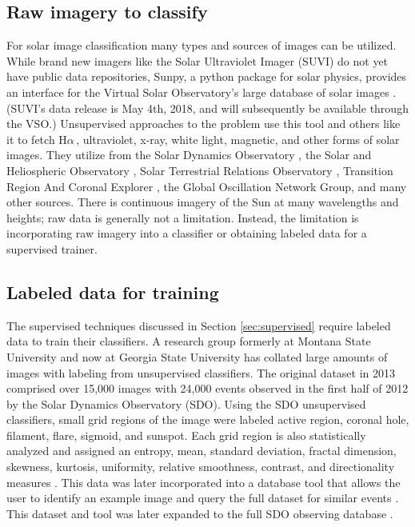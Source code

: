 \documentclass[twoside]{report}
\newcommand{\halpha}{H$\alpha$\,}
\begin{document}
\subsection{Raw imagery to classify} 
For solar image classification many types and sources of images can be utilized. While brand new imagers like the Solar Ultraviolet Imager (SUVI) do not yet have public data repositories, Sunpy, a python package for solar physics, provides an interface for the Virtual Solar Observatory's large database of solar images \cite{sunpy}. (SUVI's data release is May 4th, 2018, and will subsequently be available through the VSO.) Unsupervised approaches to the problem use this tool and others like it to fetch \halpha, ultraviolet, x-ray, white light, magnetic, and other forms of solar images. They utilize from the Solar Dynamics Observatory \cite{sdoinstrument, lemen:2012}, the Solar and Heliospheric Observatory \cite{sohoinstrument, eit}, Solar Terrestrial Relations Observatory \cite{stereoinstrument, secchipaper}, Transition Region And Coronal Explorer \cite{traceinstrument}, the Global Oscillation Network Group\cite{gong1, gong2}, and many other sources. There is continuous imagery of the Sun at many wavelengths and heights; raw data is generally not a limitation. Instead, the limitation is incorporating raw imagery into a classifier or obtaining labeled data for a supervised trainer. 

\subsection{Labeled data for training} 
The supervised techniques discussed in Section \ref{sec:supervised} require labeled data to train their classifiers. A research group formerly at Montana State University and now at Georgia State University has collated large amounts of images with labeling from unsupervised classifiers. The original dataset in 2013 comprised over 15,000 images with 24,000 events observed in the first half of 2012 by the Solar Dynamics Observatory (SDO). Using the SDO unsupervised classifiers, small grid regions of the image were labeled active region, coronal hole, filament, flare, sigmoid, and sunspot. Each grid region is also statistically analyzed and assigned an entropy, mean, standard deviation, fractal dimension, skewness, kurtosis, uniformity, relative smoothness, contrast, and directionality measures \cite{schuh:2013}. This data was later incorporated into a database tool that allows the user to identify an example image and query the full dataset for similar events \cite{banda:2014}. This dataset and tool was later expanded to the full SDO observing database \cite{schuh:2016}. 
\end{document}
